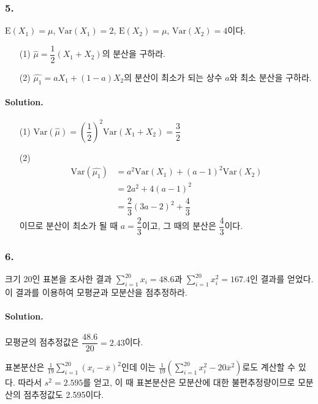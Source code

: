 \subsubsection{5.} $\mathrm{E}\left(X_1\right)=\mu$, $\mathrm{Var}\left(X_1\right)=2$, 
$\mathrm{E}\left(X_2\right)=\mu$, $\mathrm{Var}\left(X_2\right)=4$이다.

\begin{itemize}
    \item[(1)] $\hat{\mu}=\dfrac{1}{2}\left(X_1+X_2\right)$의 분산을 구하라.
    \item[(2)] $\hat{\mu_1}=aX_1+\left(1-a\right)X_2$의 분산이 최소가 되는 상수 $a$와 최소 분산을 구하라.
\end{itemize}

\paragraph{Solution.}
\begin{itemize}
    \item[(1)] {
        $\mathrm{Var}\left(\hat{\mu}\right) = \left(\dfrac{1}{2}\right)^2\mathrm{Var}\left(X_1+X_2\right) = \dfrac{3}{2}$
    }
    \item[(2)] {
        \begin{align*}
            \mathrm{Var}\left(\hat{\mu_1}\right) &= a^2\mathrm{Var}\left(X_1\right)+\left(a-1\right)^2\mathrm{Var}\left(X_2\right)\\
            &= 2a^2+4\left(a-1\right)^2 \\
            &= \dfrac{2}{3}\left(3a-2\right)^2+\dfrac{4}{3}
        \end{align*}
        이므로 분산이 최소가 될 때 $a=\dfrac{2}{3}$이고, 그 때의 분산은 $\dfrac{4}{3}$이다.
    }
\end{itemize}

\subsubsection{6.} 크기 20인 표본을 조사한 결과 $\displaystyle \sum_{i=1}^{20}x_i = 48.6$과 
$\displaystyle \sum_{i=1}^{20}x_i^2 = 167.4$인 결과를 얻었다. 이 결과를 이용하여 모평균과 모분산을 점추정하라.

\paragraph{Solution.} 모평균의 점추정값은 $\dfrac{48.6}{20}=2.43$이다.

표본분산은 $\displaystyle \frac{1}{19}\sum_{i=1}^{20} \left(x_i-\overline{x}\right)^2$인데 이는
$\displaystyle \frac{1}{19}\left(\sum_{i=1}^{20} x_i^2-20\overline{x}^2\right)$로도 계산할 수 있다. 따라서 $s^2=2.595$를 얻고,
이 때 표본분산은 모분산에 대한 불편추정량이므로 모분산의 점추정값도 2.595이다.

